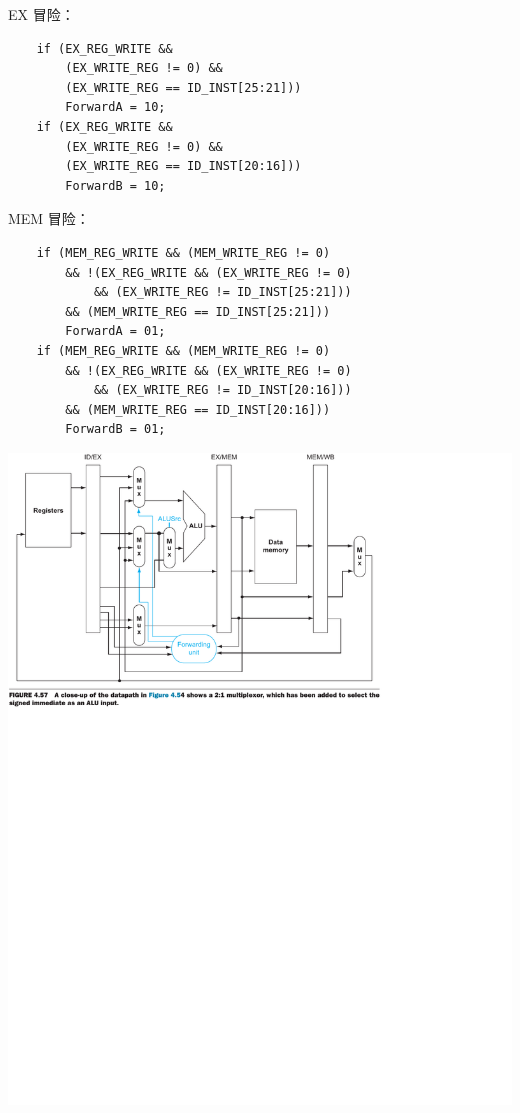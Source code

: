 \documentclass[a4paper,UTF8]{ctexart}
\begin{document}
EX 冒险：

\begin{verbatim}
    if (EX_REG_WRITE && 
        (EX_WRITE_REG != 0) && 
        (EX_WRITE_REG == ID_INST[25:21])) 
        ForwardA = 10;
    if (EX_REG_WRITE && 
        (EX_WRITE_REG != 0) && 
        (EX_WRITE_REG == ID_INST[20:16]))
        ForwardB = 10;
\end{verbatim}

MEM 冒险：

\begin{verbatim}
    if (MEM_REG_WRITE && (MEM_WRITE_REG != 0) 
        && !(EX_REG_WRITE && (EX_WRITE_REG != 0)
            && (EX_WRITE_REG != ID_INST[25:21]))
        && (MEM_WRITE_REG == ID_INST[25:21]))
        ForwardA = 01;
    if (MEM_REG_WRITE && (MEM_WRITE_REG != 0) 
        && !(EX_REG_WRITE && (EX_WRITE_REG != 0)
            && (EX_WRITE_REG != ID_INST[20:16]))
        && (MEM_WRITE_REG == ID_INST[20:16]))
        ForwardB = 01;
\end{verbatim}

\includegraphics[width=\textwidth]{Imm.pdf}
\end{document}

